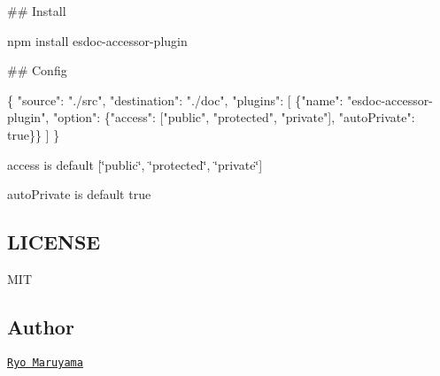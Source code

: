 \#\# Install 
\begin{DoxyCode}
npm install esdoc-accessor-plugin
\end{DoxyCode}


\#\# Config 
\begin{DoxyCode}
\{
  "source": "./src",
  "destination": "./doc",
  "plugins": [
    \{"name": "esdoc-accessor-plugin", "option": \{"access": ["public", "protected", "private"],
       "autoPrivate": true\}\}
  ]
\}
\end{DoxyCode}



\begin{DoxyItemize}
\item {\ttfamily access} is default {\ttfamily \mbox{[}\char`\"{}public\char`\"{}, \char`\"{}protected\char`\"{}, \char`\"{}private\char`\"{}\mbox{]}}
\item {\ttfamily auto\+Private} is default {\ttfamily true}
\end{DoxyItemize}

\subsection*{L\+I\+C\+E\+N\+SE}

M\+IT

\subsection*{Author}

\href{https://github.com/h13i32maru}{\tt Ryo Maruyama} 
